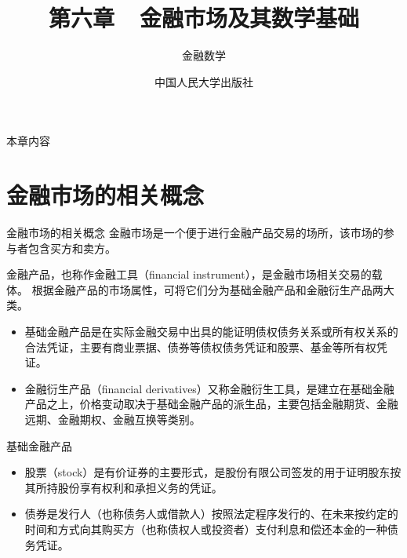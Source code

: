 \documentclass[t]{beamer}
\begin{document}
\fontsize{11}{18}\selectfont


\CTEXindent

\title{第六章~~金融市场及其数学基础}
\author{金融数学}
\date{中国人民大学出版社}
\begin{frame}
	\maketitle
\end{frame}



\begin{frame}{本章内容}
	\begin{multicols*}{2}	
		\tableofcontents
	\end{multicols*}


\end{frame}


\section{金融市场的相关概念}

\begin{frame}{金融市场的相关概念}
	金融市场是一个便于进行金融产品交易的场所，该市场的参与者包含买方和卖方。
	
	金融产品，也称作金融工具（financial instrument），是金融市场相关交易的载体。
根据金融产品的市场属性，可将它们分为基础金融产品和金融衍生产品两大类。

\begin{itemize}
	\item 基础金融产品是在实际金融交易中出具的能证明债权债务关系或所有权关系的合法凭证，主要有商业票据、债券等债权债务凭证和股票、基金等所有权凭证。
	\item 金融衍生产品（financial derivatives）又称金融衍生工具，是建立在基础金融产品之上，价格变动取决于基础金融产品的派生品，主要包括金融期货、金融远期、金融期权、金融互换等类别。
\end{itemize}
\end{frame}

\begin{frame}{基础金融产品}
	\begin{itemize}
		\item 股票（stock）是有价证券的主要形式，是股份有限公司签发的用于证明股东按其所持股份享有权利和承担义务的凭证。
		\item 债券是发行人（也称债务人或借款人）按照法定程序发行的、在未来按约定的时间和方式向其购买方（也称债权人或投资者）支付利息和偿还本金的一种债务凭证。
	\end{itemize}
\end{frame}
\end{document}
